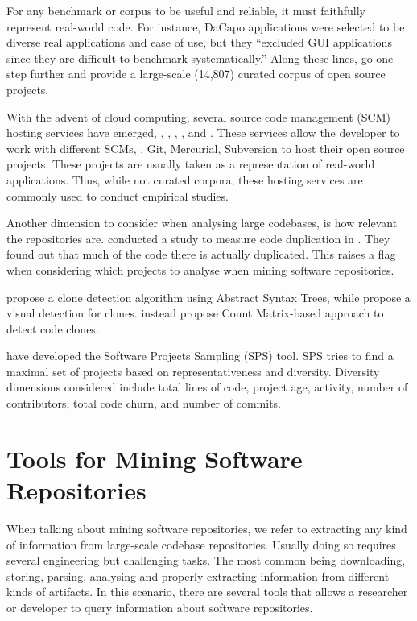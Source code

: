 For any benchmark or corpus to be useful and reliable,
it must faithfully represent real-world code.
For instance,
DaCapo applications were selected to be diverse real applications and
ease of use, but they ``excluded GUI applications since they are difficult
to benchmark systematically.''
Along these lines, \cite{allamanisMiningSourceCode2013} go one step further and provide a large-scale (14,807) curated corpus of open source \java{} projects.

With the advent of cloud computing,
several source code management (SCM) hosting services have emerged, \eg{},
\github{}, \gitlab{}, \bitbucket{}, and \sourceforge{}.
These services allow the developer to work with different SCMs, \eg,
Git, Mercurial, Subversion to host their open source projects.
These projects are usually taken as a representation of
real-world applications.
Thus, while not curated corpora, these hosting services are
commonly used to conduct empirical studies.

Another dimension to consider when analysing large codebases, is how relevant the repositories are.
\cite{lopesDeJaVuMapCode2017} conducted a study to measure code duplication in \github{}.
They found out that much of the code there is actually duplicated.
This raises a flag when considering which projects to analyse when mining software repositories.

\cite{baxterCloneDetectionUsing1998} propose a clone detection algorithm using Abstract Syntax Trees,
while \cite{riegerVisualDetectionDuplicated} propose a visual detection for clones.
\cite{yuanCMCDCountMatrix2011,chenReplicationReproductionCode} instead propose Count Matrix-based approach to detect code clones.

\cite{nagappanDiversitySoftwareEngineering2013} have developed the Software Projects Sampling (SPS) tool.
SPS tries to find a maximal set of projects based on representativeness and diversity.
Diversity dimensions considered include total lines of code,
project age, activity, number of contributors, total code churn,
and number of commits.

\section{Tools for Mining Software Repositories}
\label{sec:literature-review:mining}

When talking about mining software repositories,
we refer to extracting any kind of information from large-scale codebase repositories. 
Usually doing so requires several engineering but challenging tasks.
The most common being downloading, storing, parsing, analysing and
properly extracting information from different kinds of artifacts.
In this scenario, there are several tools that allows a researcher or developer to query information about software repositories.

